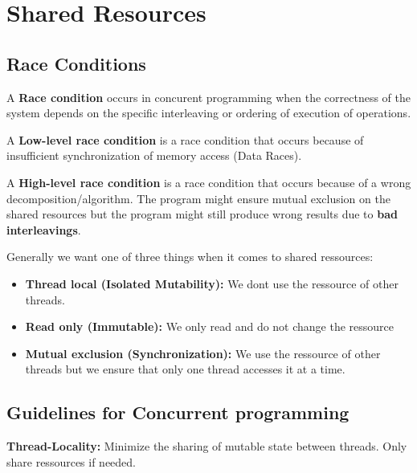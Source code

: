 \section{Shared Resources}

\subsection{Race Conditions}

\begin{definition}
    A \textbf{Race condition} occurs in concurent programming when the correctness of the system depends on
    the specific interleaving or ordering of execution of operations.
\end{definition}

\begin{definition}
    A \textbf{Low-level race condition} is a race condition that occurs because of insufficient
    synchronization of memory access (Data Races).
\end{definition}

\begin{definition}
    A \textbf{High-level race condition} is a race condition that
    occurs because of a wrong decomposition/algorithm. The program might ensure mutual exclusion on the
    shared resources but the program might still produce wrong results due to \textbf{bad interleavings}.
\end{definition}

Generally we want one of three things when it comes to shared ressources:
\begin{itemize}
    \item \textbf{Thread local (Isolated Mutability):} We dont use the ressource of other threads.
    \item \textbf{Read only (Immutable):} We only read and do not change the ressource
    \item \textbf{Mutual exclusion (Synchronization):} We use the ressource of other threads but we ensure that only one thread accesses it at a time.
\end{itemize}

\subsection{Guidelines for Concurrent programming}

\begin{important}
    \textbf{Thread-Locality:} Minimize the sharing of mutable state between threads. Only share ressources if needed.
\end{important}


